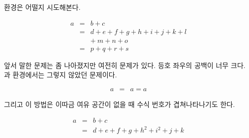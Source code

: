  환경은 어떨지 시도해본다.
\begin{examplek}
\begin{eqnarray}
  a & = & b + c \\
  & = & d + e + f + g + h + i 
  + j + k + l \nonumber \\
  && +\: m + n + o \\
  & = & p + q + r + s
\end{eqnarray}
\end{examplek}

앞서 말한 문제는 좀 나아졌지만 여전히 문제가 있다. 등호 좌우의 공백이 너무 크다.
과  환경에서는 그렇지 않았던 문제이다.
\begin{examplek}
\begin{eqnarray}
  a & = & a = a
\end{eqnarray}
\end{examplek}

\noindent \hdots\hdots{} 그리고 이 방법은 이따금 여유 공간이 없을 때 수식 번호가 겹쳐나타나기도 한다.
\begin{examplek}
\begin{eqnarray}
  a & = & b + c 
  \\
  & = & d + e + f + g + h^2 
  + i^2 + j + k
  \label{eq:faultyeqnarray}
\end{eqnarray}
\end{examplek}

